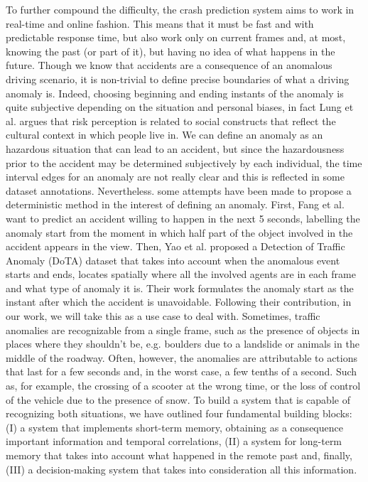 To further compound the difficulty, the crash prediction system aims to work in real-time and online fashion.
This means that it must be fast and with predictable response time, but also work only on current frames and, at most, knowing the past (or part of it), but having no idea of what happens in the future.
Though we know that accidents are a consequence of an anomalous driving scenario, it is non-trivial to define precise boundaries of what a driving anomaly is.
Indeed, choosing beginning and ending instants of the anomaly is quite subjective depending on the situation and personal biases, in fact Lung et al. \cite{lund2009riskperception} argues that risk perception is related to social constructs that reflect the cultural context in which people live in.
We can define an anomaly as an hazardous situation that can lead to an accident, but since the hazardousness prior to the accident may be determined subjectively by each individual, the time interval edges for an anomaly are not really clear and this is reflected in some dataset annotations.
Nevertheless. some attempts have been made to propose a deterministic method in the interest of defining an anomaly.
First, Fang et al. \cite{fang2019dada} want to predict an accident willing to happen in the next 5 seconds, labelling the anomaly start from the moment in which half part of the object involved in the accident appears in the view.
Then, Yao et al. \cite{yao2020when} proposed a Detection of Traffic Anomaly (DoTA) dataset that takes into account when the anomalous event starts and ends, locates spatially where all the involved agents are in each frame and what type of anomaly it is.
Their work formulates the anomaly start as the instant after which the accident is unavoidable.
Following their contribution, in our work, we will take this as a use case to deal with.
Sometimes, traffic anomalies are recognizable from a single frame, such as the presence of objects in places where they shouldn't be, e.g. boulders due to a landslide or animals in the middle of the roadway.
Often, however, the anomalies are attributable to actions that last for a few seconds and, in the worst case, a few tenths of a second.
Such as, for example, the crossing of a scooter at the wrong time, or the loss of control of the vehicle due to the presence of snow.
To build a system that is capable of recognizing both situations, we have outlined four fundamental building blocks: (I) a system that implements short-term memory, obtaining as a consequence important information and temporal correlations, (II) a system for long-term memory that takes into account what happened in the remote past and, finally, (III) a decision-making system that takes into consideration all this information.

